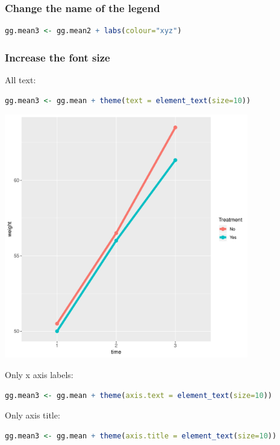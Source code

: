 \documentclass{article}
\begin{document}
\clearpage
\subsubsection{Change the name of the legend}
\label{sec:orgec9d8ab}
\begin{lstlisting}[language=r,numbers=none]
gg.mean3 <- gg.mean2 + labs(colour="xyz")
\end{lstlisting}
\subsubsection{Increase the font size}
\label{sec:orge4bc0b1}

All text:
\begin{lstlisting}[language=r,numbers=none]
gg.mean3 <- gg.mean + theme(text = element_text(size=10))
\end{lstlisting}

\begin{center}
\includegraphics[width=0.8\textwidth]{./figures/fig-meanTime3.pdf}
\end{center}

Only x axis labels:
\begin{lstlisting}[language=r,numbers=none]
gg.mean3 <- gg.mean + theme(axis.text = element_text(size=10))
\end{lstlisting}

Only axis title:
\begin{lstlisting}[language=r,numbers=none]
gg.mean3 <- gg.mean + theme(axis.title = element_text(size=10))
\end{lstlisting}
\end{document}
